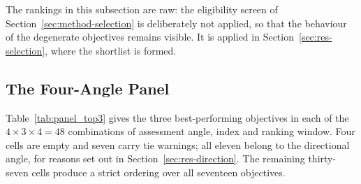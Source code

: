 \documentclass[12pt]{article}
\begin{document}
The rankings in this subsection are raw: the eligibility screen of
Section~\ref{sec:method-selection} is deliberately not applied, so that the
behaviour of the degenerate objectives remains visible. It is applied in
Section~\ref{sec:res-selection}, where the shortlist is formed.

\subsection{The Four-Angle Panel}
\label{sec:res-panel}

Table~\ref{tab:panel_top3} gives the three best-performing objectives in each
of the $4 \times 3 \times 4 = 48$ combinations of assessment angle, index and
ranking window. Four cells are empty and seven carry tie warnings; all eleven
belong to the directional angle, for reasons set out in
Section~\ref{sec:res-direction}. The remaining thirty-seven cells produce a
strict ordering over all seventeen objectives.
\end{document}
